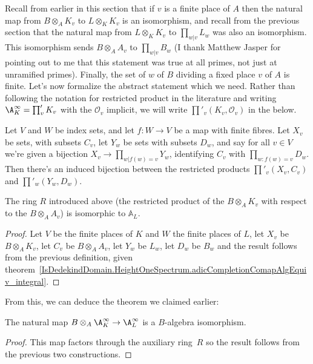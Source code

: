 Recall from earlier in this section that if $v$ is a finite place of $A$ then the natural map from
$B\otimes_A K_v$ to $L\otimes_KK_v$ is an isomorphism, and recall from the previous section
that the natural map from $L\otimes_KK_v$ to $\prod_{w|v}L_w$ was also an isomorphism.
This isomorphism sends $B\otimes_A A_v$ to $\prod_{w|v}B_w$ (I thank Matthew Jasper for
pointing out to me that this statement was true at all primes, not just at unramified primes).
Finally, the set of $w$ of $B$ dividing a fixed place $v$ of $A$ is finite.
Let's now formalize the abstract statement which we need. Rather than following the
notation for restricted product in the literature and writing $\A_K^\infty=\prod'_vK_v$
with the $\mathcal{O}_v$ implicit, we will write $\prod'_v(K_v,\mathcal{O}_v)$ in the below.

\begin{definition}
  \label{RestrictedProduct.relabelIso}
  Let $V$ and $W$ be index sets, and let $f:W\to V$ be a map with finite fibres.
  Let $X_v$ be sets, with subsets $C_v$, let $Y_w$ be sets with subsets $D_w$,
  and say for all $v\in V$ we're given a bijection $X_v\to\prod_{w|f(w)=v}Y_w$,
  identifying $C_v$ with $\prod_{w:f(w)=v}D_w$. Then there's an induced bijection between
  the restricted products $\prod'_v(X_v,C_v)$ and $\prod'_w(Y_w,D_w)$.
\end{definition}

\begin{corollary}
  \label{IsDedekindDomain.FiniteAdeleRing.IntegraltensorProductAlgEquiv_aux2}
  The ring $R$ introduced above (the restricted
  product of the $B\otimes_A K_v$ with respect to the $B\otimes_A A_v$)
  is isomorphic to $\mathbb{A}_L$.
\end{corollary}
\begin{proof} Let $V$ be the finite places of $K$ and $W$ the finite places of $L$,
  let $X_v$ be $B\otimes_A K_v$, let $C_v$ be $B\otimes_A A_v$, let $Y_w$ be $L_w$,
  let $D_w$ be $B_w$ and the result follows from the previous definition, given
  theorem~\ref{IsDedekindDomain.HeightOneSpectrum.adicCompletionComapAlgEquiv_integral}.
\end{proof}
From this, we can deduce the theorem we claimed earlier:

\begin{theorem}
  \label{IsDedekindDomain.FiniteAdeleRing.baseChangeIntegralAlgEquiv}
  The natural map $B\otimes_A\A_K^\infty\to\A_L^\infty$ is a $B$-algebra
  isomorphism.
\end{theorem}
\begin{proof}
  This map factors through the auxiliary ring~$R$ so the result follows
  from the previous two constructions.
\end{proof}

